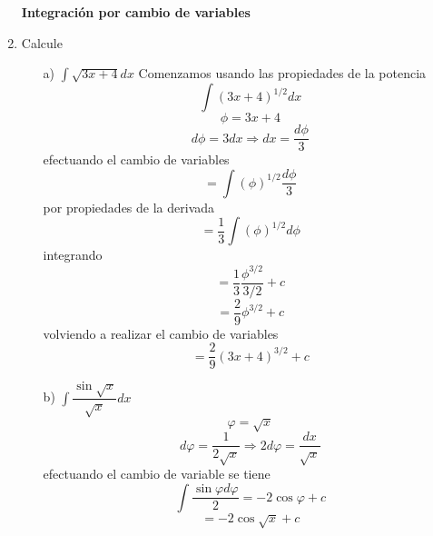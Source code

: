 \documentclass[10pt,twoside]{SelfArx} %
\begin{document}
\begin{enumerate}
\textbf{Integración por cambio de variables}\\

\item Calcule
\begin{enumerate}
	\item[a)] $ \int\sqrt{3x+4}dx $
	Comenzamos usando las propiedades de la potencia
	\begin{equation}
	\int(3x+4)^{1/2}dx
	\end{equation}
	\[ \phi=3x+4 \]
	\[ d\phi=3dx\Rightarrow dx=\dfrac{d\phi}{3} \]
	efectuando el cambio de variables
	\begin{equation}
	=\int(\phi)^{1/2}\dfrac{d\phi}{3}
	\end{equation}
	por propiedades de la derivada
	\begin{equation}
	=\dfrac{1}{3}\int(\phi)^{1/2}d\phi
	\end{equation}
	integrando
	\begin{equation}
	=\dfrac{1}{3} \dfrac{\phi^{3/2}}{3/2}+c 
	\end{equation}
	\begin{equation}
	=\dfrac{2}{9}\phi^{3/2}+c 
	\end{equation}
	volviendo a realizar el cambio de variables
	\begin{equation}
		=\dfrac{2}{9}(3x+4)^{3/2}+c
	\end{equation}
	
	\item[b)] $ \int \dfrac{\sin \sqrt{x}}{\sqrt{x}}dx $
	\[ \varphi=\sqrt{x} \]
	\[ d\varphi=\dfrac{1}{2\sqrt{x}} \Rightarrow 2d\varphi=\dfrac{dx}{\sqrt{x}}\]
	efectuando el cambio de variable se tiene 
	\begin{equation}
	\int \dfrac{\sin \varphi d\varphi}{2}=-2\cos \varphi+c
	\end{equation}
	\begin{equation}
	=-2\cos \sqrt{x}+c
	\end{equation}
	

























\end{enumerate}
\end{enumerate}
\end{document}

